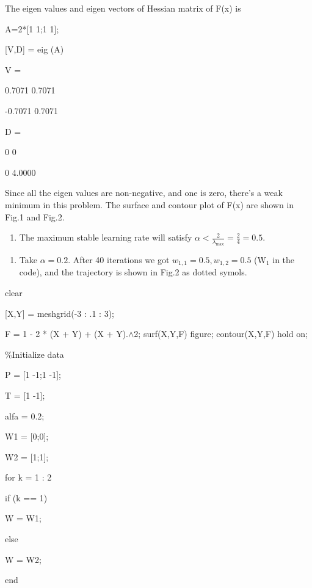 \documentclass{article}
\begin{document}
 

The eigen values and eigen vectors of Hessian matrix of F(x) is

  

 A=2*[1 1;1 1];

 [V,D] = eig (A)  

 

 V =

     0.7071    0.7071

    -0.7071    0.7071

 D =

          0         0

          0    4.0000  

 

  Since all the eigen values are non-negative, and one is zero, there's a weak minimum in this problem. The surface and contour plot of F(x) are shown in Fig.1 and Fig.2.

 

\begin{enumerate}
\item  The maximum stable learning rate will satisfy $\alpha <\frac{2}{\lambda _{\max } } =\frac{2}{4} =0.5$.
\end{enumerate}


\begin{enumerate}
\item  Take $\alpha =0.2$. After 40 iterations we got $w_{1,1} =0.5,w_{1,2} =0.5$ (W${}_{1}$ in the code), and the trajectory is shown in Fig.2 as dotted symols.
\end{enumerate}


 

 clear

 [X,Y] = meshgrid(-3 : .1 : 3);

 F = 1 - 2 * (X + Y) + (X + Y).$\boldsymbol{\mathrm{\wedge}}$2;
 surf(X,Y,F)
 figure;
 contour(X,Y,F)
 hold on;

 \%Initialize data

 P = [1 -1;1 -1];

 T = [1 -1];

 alfa = 0.2;

 W1 = [0;0];

 W2 = [1;1];

 for k = 1 : 2

\qquad    if (k == 1)

\qquad \qquad       W = W1;

\qquad    else

\qquad \qquad       W = W2;

\qquad    end
\end{document}
